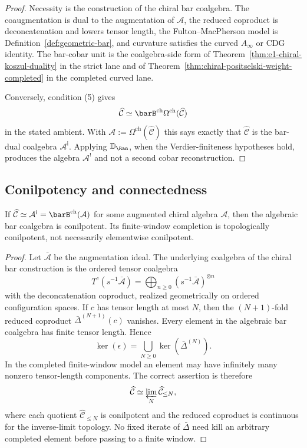 \begin{proof}
Necessity is the construction of the chiral bar coalgebra. The
coaugmentation is dual to the augmentation of $\mathcal{A}$, the
reduced coproduct is deconcatenation and lowers tensor length, the
Fulton--MacPherson model is Definition~\ref{def:geometric-bar}, and
curvature satisfies the curved $A_\infty$ or CDG identity. The
bar-cobar unit is the coalgebra-side form of
Theorem~\ref{thm:e1-chiral-koszul-duality} in the strict lane and of
Theorem~\ref{thm:chiral-positselski-weight-completed} in the completed
curved lane.

Conversely, condition (5) gives
\[
\widehat{\mathcal{C}}\simeq
\barB^{\mathrm{ch}}\Omega^{\mathrm{ch}}(\widehat{\mathcal{C}})
\]
in the stated ambient. With
$\mathcal{A}:=\Omega^{\mathrm{ch}}(\widehat{\mathcal{C}})$ this says
exactly that $\widehat{\mathcal{C}}$ is the bar-dual coalgebra
$\mathcal{A}^{\mathrm i}$. Applying $\mathbb{D}_{\Ran}$, when the
Verdier-finiteness hypotheses hold, produces the algebra
$\mathcal{A}^{!}$ and not a second cobar reconstruction.
\end{proof}

\subsection{Conilpotency and connectedness}

\begin{lemma}\label{lem:conilpotency-necessary}
If
$\widehat{\mathcal{C}}\simeq
\mathcal{A}^{\mathrm i}=\barB^{\mathrm{ch}}(\mathcal{A})$
for some augmented chiral algebra $\mathcal{A}$, then the algebraic
bar coalgebra is conilpotent. Its finite-window completion is
topologically conilpotent, not necessarily elementwise conilpotent.
\end{lemma}

\begin{proof}
Let $\bar{\mathcal{A}}$ be the augmentation ideal. The underlying
coalgebra of the chiral bar construction is the ordered tensor
coalgebra
\[
T^c(s^{-1}\bar{\mathcal{A}})
=\bigoplus_{n\geq 0}(s^{-1}\bar{\mathcal{A}})^{\otimes n}
\]
with the deconcatenation coproduct, realized geometrically on
ordered configuration spaces. If $c$ has tensor length at most $N$,
then the $(N+1)$-fold reduced coproduct $\bar\Delta^{(N+1)}(c)$
vanishes. Every element in the algebraic bar coalgebra has finite
tensor length. Hence
\[
\ker(\epsilon)=\bigcup_{N\geq 0}\ker(\bar\Delta^{(N)}).
\]
In the completed finite-window model an element may have infinitely
many nonzero tensor-length components. The correct assertion is
therefore
\[
\widehat{\mathcal{C}}
\simeq
\varprojlim_N \widehat{\mathcal{C}}_{\leq N},
\]
where each quotient $\widehat{\mathcal{C}}_{\leq N}$ is conilpotent
and the reduced coproduct is continuous for the inverse-limit
topology. No fixed iterate of $\bar\Delta$ need kill an arbitrary
completed element before passing to a finite window.
\end{proof}

